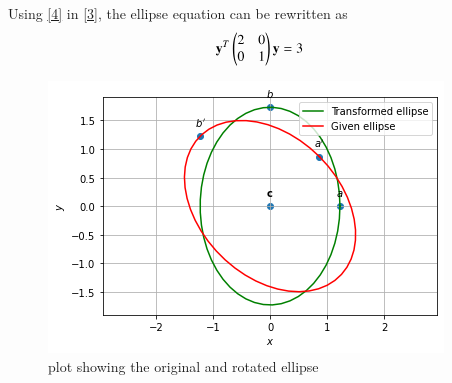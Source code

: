 \documentclass[journal,12pt,twocolumn]{IEEEtran}
\begin{document}
Using \eqref{4} in \eqref{3}, the ellipse equation can be rewritten as
\begin{align}
     \mathbf{y}^T\begin{pmatrix}2&0\\0&1\end{pmatrix}\mathbf{y}=3
\end{align}
\begin{figure}[!ht]
\centering
\includegraphics[width=\columnwidth]{ellipse.png}
\caption{plot showing the original and rotated ellipse}
\label{Fig}
\end{figure}
\end{document}
